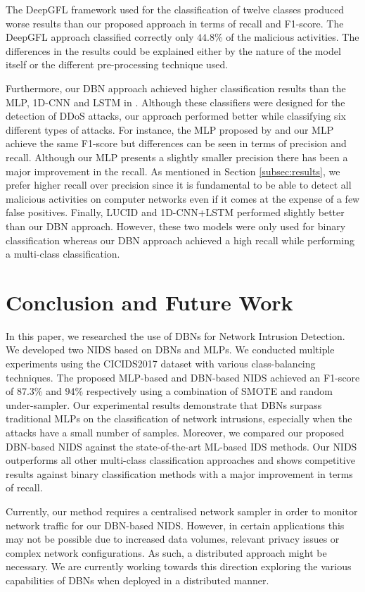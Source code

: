 \documentclass[runningheads]{llncs}
\begin{document}
The DeepGFL \cite{DeepGFL} framework used for the classification of twelve classes produced worse results than our proposed approach in terms of recall and F1-score. The DeepGFL approach classified correctly only $44.8$\% of the malicious activities. The differences in the results could be explained either by the nature of the model itself or the different pre-processing technique used.

Furthermore, our \ac{DBN} approach achieved higher classification results than the \ac{MLP}, 1D-\ac{CNN} and LSTM in \cite{1D-CNN-LSTM}. Although these classifiers were designed for the detection of \ac{DDoS} attacks, our approach performed better while classifying six different types of attacks. For instance, the \ac{MLP} proposed by \cite{1D-CNN-LSTM} and our \ac{MLP} achieve the same F1-score but differences can be seen in terms of precision and recall. Although our \ac{MLP} presents a slightly smaller precision there has been a major improvement in the recall. As mentioned in Section \ref{subsec:results}, we prefer higher recall over precision since it is fundamental to be able to detect all malicious activities on computer networks even if it comes at the expense of a few false positives.
Finally, LUCID \cite{LUCID} and 1D-\ac{CNN}+LSTM \cite{1D-CNN-LSTM} performed slightly better than our \ac{DBN} approach. However, these two models were only used for binary classification whereas our \ac{DBN} approach achieved a high recall while performing a multi-class classification. \section{Conclusion and Future Work}
\label{sec:conclusion}

In this paper, we researched the use of \acp{DBN} for Network Intrusion Detection. We developed two \ac{NIDS} based on \acp{DBN} and \acp{MLP}. We conducted multiple experiments using the CICIDS2017 dataset with various class-balancing techniques. The proposed \ac{MLP}-based and \ac{DBN}-based \ac{NIDS} achieved an F1-score of $87.3$\% and $94$\% respectively using a combination of \ac{SMOTE} and random under-sampler. Our experimental results demonstrate that \acp{DBN} surpass traditional \acp{MLP} on the classification of network intrusions, especially when the attacks have a small number of samples. Moreover, we compared our proposed \ac{DBN}-based \ac{NIDS} against the state-of-the-art ML-based IDS methods. Our \ac{NIDS} outperforms all other multi-class classification approaches and shows competitive results against binary classification methods with a major improvement in terms of recall. 

Currently, our method requires a centralised network sampler in order to monitor network traffic for our \ac{DBN}-based \ac{NIDS}. However, in certain applications this may not be possible due to increased data volumes, relevant privacy issues or complex network configurations. As such, a distributed approach might be necessary. We are currently working towards this direction exploring the various capabilities of \acp{DBN} when deployed in a distributed manner. 


\end{document}
